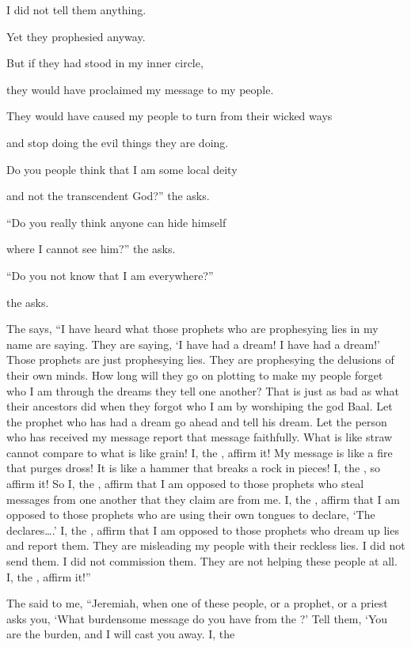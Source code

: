 {\par }{\Q I did not
tell
them anything.
\par }{\Q Yet they
prophesied anyway.
\par }{\Q {}But if
they had stood
in my inner circle,
\par }{\Q they would have proclaimed
my message
to my people.
\par }{\Q They would have caused my people
to turn
from their wicked ways
\par }{\Q and stop doing the evil
things they are doing.
\par }{\Q {}Do you people think
that I
am
some local deity
\par }{\Q and not the transcendent
God?”
 the
{}
asks.
\par }{\Q {}“Do you really think anyone
can hide
himself
\par }{\Q where I
cannot
see
him?” the
{}
asks.
\par }{\Q “Do you not
know that I
am everywhere?”

\par }{\Q the {}
asks.
\par }{\PP {}The
{} says, “I have heard
what
those prophets
who are prophesying
lies
in my name
are saying.
They are saying, ‘I
have had a dream! I have had a dream!’
Those prophets
are just prophesying
lies.
They are prophesying
the delusions
of their own minds.
How
long will they go on plotting
to make my
people
forget
who I am through the dreams
they tell
one
another? That is just
as bad as what their ancestors
did when they forgot
who I am by worshiping
the god Baal.
Let the prophet
who has had
a dream
go ahead and tell
his dream.
Let the person who
has
received my message
report
that message
faithfully.
What
is like straw
cannot compare
to what is like grain! I, the
{}, affirm it!
My message
is like a fire
that purges
dross! It is like a hammer
that breaks a rock
in pieces! I, the
{}, so affirm it!
So
I, the
{}, affirm
that I am opposed
to those prophets
who steal
messages
from one
another that they claim are from me.
I,
the {},
affirm
that I am opposed
to those prophets
who are using
their own tongues
to declare,
‘The
{} declares….’
I, the
{}, affirm
that I am
opposed
to those prophets who
dream
up lies
and report
them. They are misleading my
people
with their reckless
lies.
I
did not send
them. I did not commission
them.
They are not
helping
these
people
at all. I, the
{}, affirm it!”
\par }{\PP {}The
{}
said
to me,
“Jeremiah,
when
one of these
people,
or
a prophet,
or
a priest
asks
you, ‘What
burdensome
message do you have from the
{}?’ Tell them, ‘You are the burden,
and I
will cast
you away. I,
the

}
